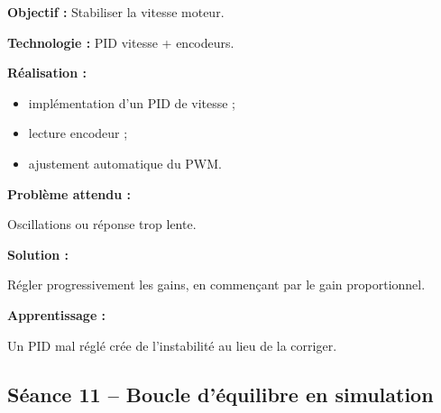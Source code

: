 \documentclass[11pt,a4paper]{article}
\begin{document}
	\begin{sessionbox}
		
		\textbf{Objectif :} Stabiliser la vitesse moteur.
		
		\vspace{0.3cm}
		
		\textbf{Technologie :} PID vitesse + encodeurs.
		
		\vspace{0.3cm}
		
		\textbf{Réalisation :}
		
		\begin{itemize}
			\item implémentation d'un PID de vitesse ;
			\item lecture encodeur ;
			\item ajustement automatique du PWM.
		\end{itemize}
		
		\vspace{0.3cm}
		
		\textbf{Problème attendu :}
		
		Oscillations ou réponse trop lente.
		
		\vspace{0.3cm}
		
		\textbf{Solution :}
		
		Régler progressivement les gains, en commençant par le gain proportionnel.
		
		\vspace{0.3cm}
		
		\textbf{Apprentissage :}
		
		Un PID mal réglé crée de l'instabilité au lieu de la corriger.
		
	\end{sessionbox}
	
	\subsection*{Séance 11 -- Boucle d'équilibre en simulation}
	
\end{document}
